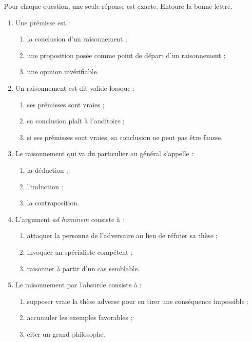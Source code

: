 \documentclass[11pt]{article}
\newcommand{\cle}[1]{{\popxbold\color{popdark}#1}}
\begin{document}
\begin{exercice}
Pour chaque question, une seule réponse est exacte. Entoure la bonne lettre.
\begin{enumerate}
\item Une \cle{prémisse} est :
\begin{enumerate}
\item la conclusion d'un raisonnement ;
\item une proposition posée comme point de départ d'un raisonnement ;
\item une opinion invérifiable.
\end{enumerate}
\item Un raisonnement est dit \cle{valide} lorsque :
\begin{enumerate}
\item ses prémisses sont vraies ;
\item sa conclusion plaît à l'auditoire ;
\item si ses prémisses sont vraies, sa conclusion ne peut pas être fausse.
\end{enumerate}
\item Le raisonnement qui va du particulier au général s'appelle :
\begin{enumerate}
\item la déduction ;
\item l'induction ;
\item la contraposition.
\end{enumerate}
\item L'argument \emph{ad hominem} consiste à :
\begin{enumerate}
\item attaquer la personne de l'adversaire au lieu de réfuter sa thèse ;
\item invoquer un spécialiste compétent ;
\item raisonner à partir d'un cas semblable.
\end{enumerate}
\item Le raisonnement par l'absurde consiste à :
\begin{enumerate}
\item supposer vraie la thèse adverse pour en tirer une conséquence impossible ;
\item accumuler les exemples favorables ;
\item citer un grand philosophe.
\end{enumerate}
\end{enumerate}
\end{exercice}
\end{document}
